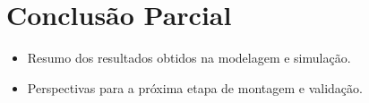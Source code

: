 \documentclass[9pt,a4paper,twocolumn,twoside]{tau-class/tau}
\begin{document}
\section{Conclusão Parcial}
\begin{itemize}
    \item Resumo dos resultados obtidos na modelagem e simulação.
    \item Perspectivas para a próxima etapa de montagem e validação.
\end{itemize}

    
    
    
    


\printbibliography

\end{document}

